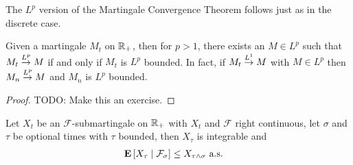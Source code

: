 The $L^p$ version of the Martingale Convergence Theorem follows just
as in the discrete case.  
\begin{thm}\label{LpMartingaleConvergenceContinuous}Given a
  martingale $M_t$ on $\reals_+$, then for $p > 1$, there exists an $M \in L^p$ such that $M_t
  \tolp{p} M$ if and only if $M_t$ is $L^p$ bounded.  In fact, if $M_t
  \tolp{1} M$ with $M \in L^p$ then $M_n \tolp{p} M$ and $M_n$
  is $L^p$ bounded.
\end{thm}
\begin{proof}
TODO: Make this an exercise.
\end{proof}

\begin{thm}\label{OptionalSamplingContinuous}Let $X_t$ be an $\mathcal{F}$-submartingale on $\reals_+$
  with $X_t$ and $\mathcal{F}$ right continuous, let $\sigma$ and
  $\tau$ be optional times with $\tau$ bounded, then $X_\tau$ is
  integrable and
\begin{align*}
\cexpectationlong{\mathcal{F}_\sigma}{X_\tau} &\leq X_{\tau \wedge
  \sigma} \text{ a.s.}
\end{align*}
\end{thm}
